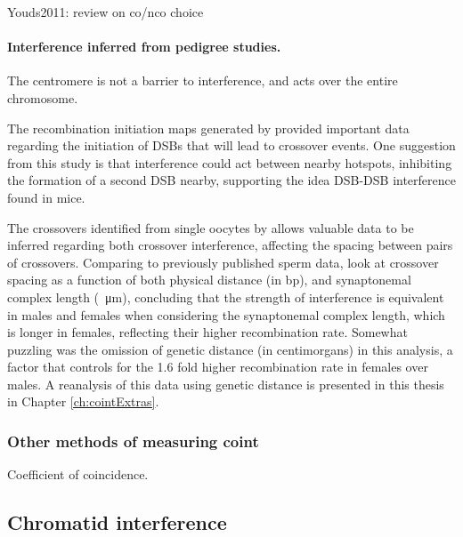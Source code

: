 Youds2011: review on co/nco choice

\paragraph{Interference inferred from pedigree studies.}

The centromere is not a barrier to interference\cite{Broman2000,Fledel-Alon2009}, and acts over the entire chromosome.

The recombination initiation maps generated by \citet{Pratto2014} provided important data regarding the initiation of DSBs that will lead to crossover events.
One suggestion from this study is that interference could act between nearby hotspots, inhibiting the formation of a second DSB nearby, supporting the idea DSB-DSB interference found in mice.

The crossovers identified from single oocytes by \citet{Hou2013}
allows valuable data to be inferred regarding both crossover interference, affecting the spacing between pairs of crossovers.
Comparing to previously published sperm data\cite{Lu2012}, \citet{Hou2013} look at crossover spacing as a function of both physical distance (in bp), and synaptonemal complex length (\SI{}{\micro\metre}), concluding that the strength of interference is equivalent in males and females when considering the synaptonemal complex length, which is longer in females, reflecting their higher recombination rate.
Somewhat puzzling was the omission of genetic distance (in centimorgans) in this analysis, a factor that controls for the 1.6 fold higher recombination rate in females over males.
A reanalysis of this data using genetic distance is presented in this thesis in Chapter \ref{ch:cointExtras}.


\subsubsection{Other methods of measuring coint}
Coefficient of coincidence.

\subsection{Chromatid interference}


